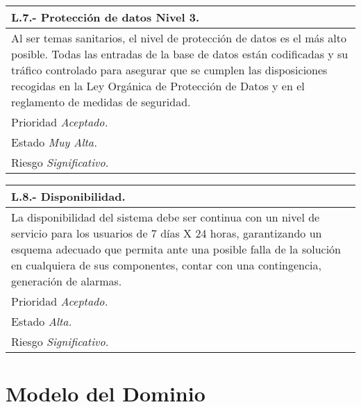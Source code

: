 \documentclass[a4paper,oneside,11pt]{book}
\begin{document}
\begin{center}
\begin{tabulary}{15cm}{|L|}
	\hline
		\bf{L.7.- Protección de datos Nivel 3.} \\
	\hline
		Al ser temas sanitarios, el nivel de protección de datos es el más alto posible. Todas las entradas de la base de datos están codificadas y su tráfico controlado para asegurar que se cumplen las disposiciones recogidas en la Ley Orgánica de Protección de Datos y en el reglamento de medidas de seguridad. \\
	\hline
		Prioridad \textit{Aceptado.} \\
	\hline
		Estado \textit{Muy Alta.} \\
	\hline
		Riesgo \textit{Significativo.} \\
	\hline
\end{tabulary}
\end{center}

\begin{center}
\begin{tabulary}{15cm}{|L|}
	\hline
		\bf{L.8.- Disponibilidad.} \\
	\hline
		La disponibilidad del sistema debe ser continua con un nivel de servicio para los usuarios de 7 días X 24 horas, garantizando un esquema adecuado que permita ante una posible falla de la solución en cualquiera de sus componentes, contar con una contingencia, generación de alarmas. \\
	\hline
		Prioridad \textit{Aceptado.} \\
	\hline
		Estado \textit{Alta.} \\
	\hline
		Riesgo \textit{Significativo.} \\
	\hline
\end{tabulary}
\end{center}



\section{Modelo del Dominio}
\end{document}
